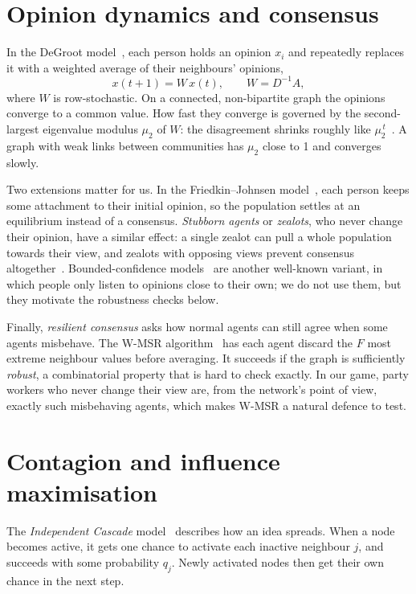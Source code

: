 \documentclass[11pt,a4paper,oneside]{report}
\begin{document}
\section{Opinion dynamics and consensus}

In the DeGroot model~\cite{degroot1974}, each person holds an opinion $x_i$ and repeatedly replaces it with
a weighted average of their neighbours' opinions,
\begin{equation}
  x(t+1) = W\,x(t), \qquad W = D^{-1}A ,
\end{equation}
where $W$ is row-stochastic. On a connected, non-bipartite graph the opinions converge to a common value.
How fast they converge is governed by the second-largest eigenvalue modulus $\mu_2$ of $W$: the
disagreement shrinks roughly like $\mu_2^{\,t}$~\cite{olfati2007,golub2010}. A graph with weak links between
communities has $\mu_2$ close to 1 and converges slowly.

Two extensions matter for us. In the Friedkin--Johnsen model~\cite{friedkin1990}, each person keeps some
attachment to their initial opinion, so the population settles at an equilibrium instead of a consensus.
\emph{Stubborn agents} or \emph{zealots}, who never change their opinion, have a similar effect: a single
zealot can pull a whole population towards their view, and zealots with opposing views prevent consensus
altogether~\cite{mobilia2003,acemoglu2011}. Bounded-confidence models~\cite{hegselmann2002} are another
well-known variant, in which people only listen to opinions close to their own; we do not use them, but
they motivate the robustness checks below.

Finally, \emph{resilient consensus} asks how normal agents can still agree when some agents misbehave. The
W-MSR algorithm~\cite{leblanc2013} has each agent discard the $F$ most extreme neighbour values before
averaging. It succeeds if the graph is sufficiently \emph{robust}, a combinatorial property that is hard to
check exactly. In our game, party workers who never change their view are, from the network's point of
view, exactly such misbehaving agents, which makes W-MSR a natural defence to test.

\section{Contagion and influence maximisation}

The \emph{Independent Cascade} model~\cite{goldenberg2001,kempe2003} describes how an idea spreads. When a
node becomes active, it gets one chance to activate each inactive neighbour $j$, and succeeds with some
probability $q_j$. Newly activated nodes then get their own chance in the next step.
\end{document}
